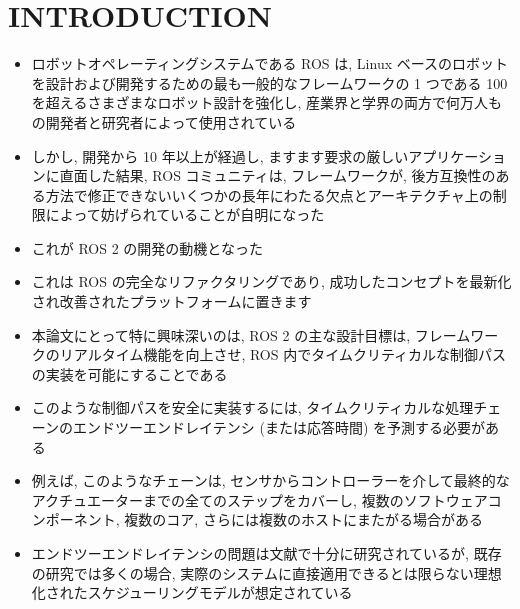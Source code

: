 
\section{INTRODUCTION}
\label{sec: introduction}

\begin{frame}{}
    \begin{itemize}
        \item ロボットオペレーティングシステムである ROS は, Linux ベースのロボットを設計および開発するための最も一般的なフレームワークの 1 つである 100 を超えるさまざまなロボット設計を強化し, 産業界と学界の両方で何万人もの開発者と研究者によって使用されている
        \item しかし, 開発から 10 年以上が経過し, ますます要求の厳しいアプリケーションに直面した結果, ROS コミュニティは, フレームワークが, 後方互換性のある方法で修正できないいくつかの長年にわたる欠点とアーキテクチャ上の制限によって妨げられていることが自明になった
    \end{itemize}
\end{frame}

\begin{frame}{}
    \begin{itemize}
        \item これが ROS 2 の開発の動機となった
        \item これは ROS の完全なリファクタリングであり, 成功したコンセプトを最新化され改善されたプラットフォームに置きます
        \item 本論文にとって特に興味深いのは, ROS 2 の主な設計目標は, フレームワークのリアルタイム機能を向上させ, ROS 内でタイムクリティカルな制御パスの実装を可能にすることである
    \end{itemize}
\end{frame}


\begin{frame}{}
    \begin{itemize}
        \item このような制御パスを安全に実装するには, タイムクリティカルな処理チェーンのエンドツーエンドレイテンシ (または応答時間) を予測する必要がある
        \item 例えば, このようなチェーンは, センサからコントローラーを介して最終的なアクチュエーターまでの全てのステップをカバーし, 複数のソフトウェアコンポーネント, 複数のコア, さらには複数のホストにまたがる場合がある
        \item エンドツーエンドレイテンシの問題は文献で十分に研究されているが, 既存の研究では多くの場合, 実際のシステムに直接適用できるとは限らない理想化されたスケジューリングモデルが想定されている
    \end{itemize}
\end{frame}

